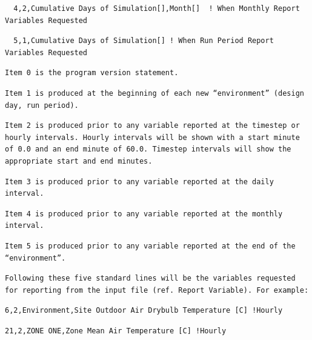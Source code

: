 \begin{lstlisting}
  4,2,Cumulative Days of Simulation[],Month[]  ! When Monthly Report Variables Requested
\end{lstlisting}

\begin{lstlisting}
  5,1,Cumulative Days of Simulation[] ! When Run Period Report Variables Requested
\end{lstlisting}

\begin{lstlisting}
Item 0 is the program version statement.
\end{lstlisting}

\begin{lstlisting}
Item 1 is produced at the beginning of each new “environment” (design day, run period).
\end{lstlisting}

\begin{lstlisting}
Item 2 is produced prior to any variable reported at the timestep or hourly intervals. Hourly intervals will be shown with a start minute of 0.0 and an end minute of 60.0. Timestep intervals will show the appropriate start and end minutes.
\end{lstlisting}

\begin{lstlisting}
Item 3 is produced prior to any variable reported at the daily interval.
\end{lstlisting}

\begin{lstlisting}
Item 4 is produced prior to any variable reported at the monthly interval.
\end{lstlisting}

\begin{lstlisting}
Item 5 is produced prior to any variable reported at the end of the “environment”.
\end{lstlisting}

\begin{lstlisting}
Following these five standard lines will be the variables requested for reporting from the input file (ref. Report Variable). For example:
\end{lstlisting}

\begin{lstlisting}
6,2,Environment,Site Outdoor Air Drybulb Temperature [C] !Hourly
\end{lstlisting}

\begin{lstlisting}
21,2,ZONE ONE,Zone Mean Air Temperature [C] !Hourly
\end{lstlisting}

